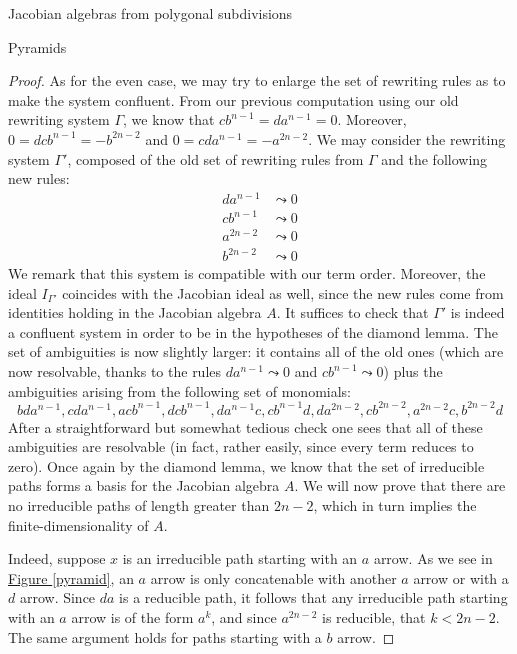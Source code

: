 \begin{chapter}{Jacobian algebras from polygonal subdivisions}
\begin{section}{Pyramids}
\begin{proof}
As for the even case, we may try to enlarge the set of rewriting rules as to make the system confluent. From our previous computation using our old rewriting system $\Gamma$, we know that $cb^{n-1}=da^{n-1}=0$. Moreover,  $0=dcb^{n-1}=-b^{2n-2}$ and  $0=cda^{n-1}=-a^{2n-2}$. We may consider the rewriting system $\Gamma'$, composed of the old set of rewriting rules from $\Gamma$ and the following new rules:
\begin{align*}
da^{n-1} &\leadsto 0 \\
cb^{n-1} &\leadsto 0\\
a^{2n-2} &\leadsto 0\\
b^{2n-2} &\leadsto 0
\end{align*}
We remark that this system is compatible with our term order. Moreover, the ideal $I_{\Gamma'}$ coincides with the Jacobian ideal as well, since the new rules come from identities holding in the Jacobian algebra $A$. It suffices to check that $\Gamma'$ is indeed a confluent system in order to be in the hypotheses of the diamond lemma. The set of ambiguities is now slightly larger: it contains all of the old ones (which are now resolvable, thanks to the rules $da^{n-1} \leadsto 0$ and $cb^{n-1} \leadsto 0$) plus the ambiguities arising from the following set of monomials:
\[bda^{n-1}, cda^{n-1}, acb^{n-1}, dcb^{n-1}, da^{n-1}c, cb^{n-1}d, da^{2n-2}, cb^{2n-2}, a^{2n-2}c, b^{2n-2}d\]
After a straightforward but somewhat tedious check one sees that all of these ambiguities are resolvable (in fact, rather easily, since every term reduces to zero). Once again by the diamond lemma, we know that the set of irreducible paths forms a basis for the Jacobian algebra $A$. We will now prove that there are no irreducible paths of length greater than $2n-2$, which in turn implies the finite-dimensionality of $A$.

Indeed, suppose $x$ is an irreducible path starting with an $a$ arrow. As we see in \hyperref[pyramid]{Figure \ref*{pyramid}}, an $a$ arrow is only concatenable with another $a$ arrow or with a $d$ arrow. Since $da$ is a reducible path, it follows that any irreducible path starting with an $a$ arrow is of the form $a^k$, and since $a^{2n-2}$ is reducible, that $k<2n-2$. The same argument holds for paths starting with a $b$ arrow.


\end{proof}
\end{section}
\end{chapter}
